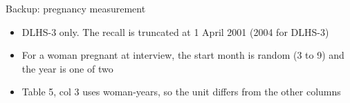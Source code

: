 \documentclass[aspectratio=169,11pt]{beamer}
\begin{document}
\begin{frame}{Backup: pregnancy measurement}
  \begin{itemize}
    \item DLHS-3 only. The recall is truncated at 1 April 2001 (2004 for DLHS-3)
    \item For a woman pregnant at interview, the start month is random (3 to 9) and the year is one of two
    \item Table 5, col 3 uses woman-years, so the unit differs from the other columns
  \end{itemize}
\end{frame}
\end{document}
